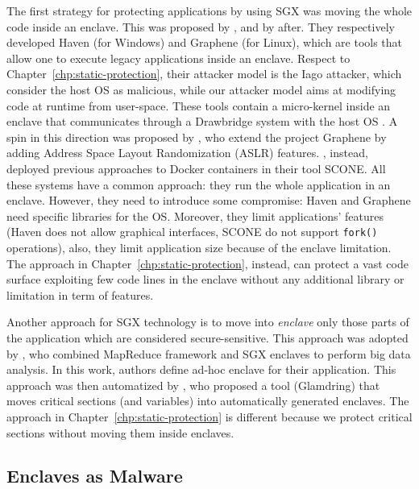 The first strategy for protecting applications by using SGX was
moving the whole code inside an enclave.
This was proposed by \cite{baumann2015shielding}, and by 
\cite{tsai2017graphene} after.
They respectively developed Haven (for Windows) and Graphene (for Linux), which 
are tools that allow one to execute legacy applications inside an enclave.
Respect to Chapter~\ref{chp:static-protection}, their attacker model is the 
Iago attacker, which consider the host OS as malicious, while our attacker 
model aims at modifying code at runtime from user-space.
These tools contain a micro-kernel inside an enclave that communicates
through a Drawbridge system with the host OS \citep{porter2011rethinking}.
A spin in this direction was proposed by \cite{seo2017sgx}, who 
extend the project Graphene by adding Address Space Layout Randomization (ASLR) 
features.
\cite{arnautov2016scone}, instead, deployed previous approaches 
to Docker containers in their tool SCONE.
All these systems have a common approach: they run the whole application in an 
enclave. 
However, they need to introduce some compromise: Haven and Graphene need 
specific libraries for the OS.
Moreover, they limit applications' features (\eg Haven does not allow graphical 
interfaces, SCONE do not support \texttt{fork()} operations), also, they limit 
application size because of the enclave limitation.
The approach in Chapter~\ref{chp:static-protection}, instead, can protect a 
vast code surface exploiting few code lines in the enclave without any 
additional library or limitation in term of features.

Another approach for SGX technology is to move into \emph{enclave} only those 
parts of the application which are considered secure-sensitive.
This approach was adopted by \cite{schuster2015vc3}, who combined MapReduce 
framework and SGX enclaves to perform big data analysis.
In this work, authors define ad-hoc enclave for their application.
This approach was then automatized by \cite{lind2017glamdring}, who proposed a 
tool (Glamdring) that moves critical sections (and variables) into 
automatically generated enclaves.
The approach in Chapter~\ref{chp:static-protection} is different because we 
protect critical sections without moving them inside enclaves.

\subsection{Enclaves as Malware}
\label{ssec:enclave-as-malware}

